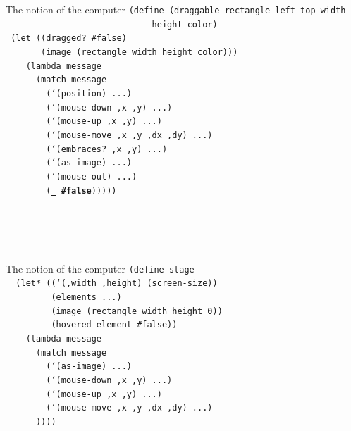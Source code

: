 \documentclass{beamer}
\begin{document}
\begin{frame}{The notion of the computer}
  \small
  \texttt{(define (draggable-rectangle left top width \\
    \ \ \ \ \ \ \ \ \ \ \ \ \ \ \ \ \ \ \ \ \ \ \ \ \ \ \ \ \ height color)\\
    \ (let ((dragged? \#false)\\
  \ \ \ \ \ \ \ (image (rectangle width height color)))\\
  \ \ \ \ (lambda message\\
  \ \ \ \ \ \ (match message\\
  \ \ \ \ \ \ \ \ (`(position) ...)\\
  \ \ \ \ \ \ \ \ (`(mouse-down ,x ,y) ...)\\
  \ \ \ \ \ \ \ \ (`(mouse-up ,x ,y) ...)\\
  \ \ \ \ \ \ \ \ (`(mouse-move ,x ,y ,dx ,dy) ...)\\
  \ \ \ \ \ \ \ \ (`(embraces? ,x ,y) ...)\\
  \ \ \ \ \ \ \ \ (`(as-image) ...)\\
  \ \ \ \ \ \ \ \ (`(mouse-out) ...)\\
  \ \ \ \ \ \ \ \ (\textbf{\_ \#false})))))\\
  \ \\
  \ \\
  \ \\
  \ 
}
\end{frame}

\begin{frame}{The notion of the computer}
  \scriptsize
  \texttt{(define stage\\
    \ \ (let* ((`(,width ,height) (screen-size))\\
    \ \ \ \ \ \ \ \ \ (elements ...)\\
    \ \ \ \ \ \ \ \ \ (image (rectangle width height 0))\\
    \ \ \ \ \ \ \ \ \ (hovered-element \#false))\\
    \ \ \ \ (lambda message\\
    \ \ \ \ \ \ (match message\\
    \ \ \ \ \ \ \ \ (`(as-image) ...)\\
    \ \ \ \ \ \ \ \ (`(mouse-down ,x ,y) ...)\\
    \ \ \ \ \ \ \ \ (`(mouse-up ,x ,y) ...)\\
    \ \ \ \ \ \ \ \ (`(mouse-move ,x ,y ,dx ,dy) ...)\\
    \ \ \ \ \ \ ))))\\
    \ \\
    \ \\
    \ \\
    \ \\
    \ \\
    \ \\
    \ \\
    \ \\
    \ \\
    \ \\
    \ 
}
\end{frame}
\end{document}
